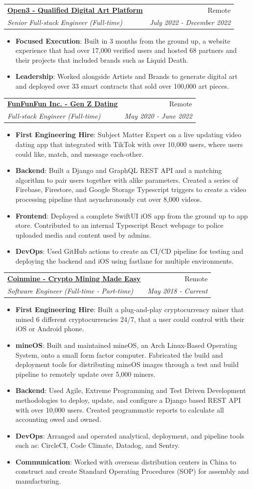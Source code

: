 \documentclass[a4paper,20pt]{article}
\makeatletter
\newcommand{\resumeItem}[2]{
  \item\small{
    \textbf{#1}{: #2 \vspace{-2pt}}
  }
}
\newcommand{\resumeSubheading}[4]{
  \vspace{-1pt}\item
    \begin{tabular*}{0.97\textwidth}{l@{\extracolsep{\fill}}r}
      \textbf{#1} & #2 \\
      \textit{#3} & \textit{#4} \\
    \end{tabular*}\vspace{-5pt}
}
\newcommand{\resumeItemListStart}{\begin{itemize}}
\newcommand{\resumeItemListEnd}{\end{itemize}\vspace{-5pt}}
\makeatother
\begin{document}
  \resumeSubheading{\underline{\href{http://open3.com}{Open3 - Qualified Digital Art Platform}}}{Remote}
    {Senior Full-stack Engineer (Full-time)}{July 2022 - December 2022}
    \resumeItemListStart
          \resumeItem{Focused Execution}
          {Built in 3 months from the ground up, a website experience that had over 17,000 verified users and hosted 68 partners and their projects that included brands such as Liquid Death.}
          \resumeItem{Leadership}
          {Worked alongside Artists and Brands to generate digital art and deployed over 33 smart contracts that sold over 100,000 art pieces.}
          \resumeItemListEnd

          \resumeSubheading{\underline{\href{http://funfunfun.app}{FunFunFun Inc. - Gen Z Dating}}}{Remote}
    {Full-stack Engineer (Full-time)}{May 2020 - June 2022}
    \resumeItemListStart
        \resumeItem{First Engineering Hire}
          {Subject Matter Expert on a live updating video dating app that integrated with TikTok with over 10,000 users, where users could like, match, and message each-other.}
          \resumeItem{Backend}
          {Built a Django and GraphQL REST API and a matching algorithm to pair users together with alike parameters. Created a series of Firebase, Firestore, and Google Storage Typescript triggers to create a video processing pipeline that asynchronously cut over 8,000 videos.}
          \resumeItem{Frontend}
          {Deployed a complete SwiftUI iOS app from the ground up to app store. Contributed to an internal Typescript React webpage to police uploaded media and content used by admins.}
          \resumeItem{DevOps}
          {Used GitHub actions to create an CI/CD pipeline for testing and deploying the backend and iOS using fastlane for multiple environments.}
      \resumeItemListEnd

    \resumeSubheading
    {\underline{\href{http://coinmine.com}{Coinmine - Crypto Mining Made Easy}}}{Remote}
		{Software Engineer (Full-time - Part-time)}{May 2018 - Current}
		\resumeItemListStart
        \resumeItem{First Engineering Hire}
        {Built a plug-and-play cryptocurrency miner that mined 6 different cryptocurrencies 24/7, that a user could control with their iOS or Android phone.}
        \resumeItem{mineOS}
        {Built and maintained mineOS, an Arch Linux-Based Operating System, onto a small form factor computer. Fabricated the build and deployment tools for distributing mineOS images through a test and build pipeline to remotely update over 5,000 miners.}
        \resumeItem{Backend}
        {Used Agile, Extreme Programming and Test Driven Development methodologies to deploy, update, and configure a Django based REST API with over 10,000 users. Created programmatic reports to calculate all accounting owed and owned.}
        \resumeItem{DevOps}
        {Arranged and operated analytical, deployment, and pipeline tools such as: CircleCI, Code Climate, Datadog, and Sentry.}
        \resumeItem{Communication}
        {Worked with overseas distribution centers in China to construct and create Standard Operating Procedures (SOP) for assembly and manufacturing.}
		\resumeItemListEnd
\end{document}
